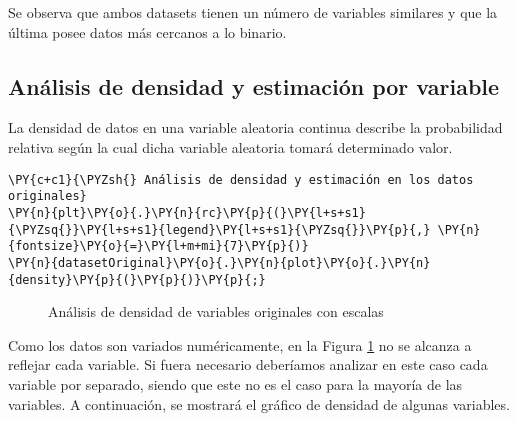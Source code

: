     Se observa que ambos datasets tienen un número de variables similares y que la última posee datos más cercanos a lo binario.

    \hypertarget{anuxe1lisis-de-densidad-y-estimaciuxf3n-por-variable}{%
\subsection{Análisis de densidad y estimación por variable}\label{anuxe1lisis-de-densidad-y-estimaciuxf3n-por-variable}}

La densidad de datos en una variable aleatoria continua describe la probabilidad relativa según la cual dicha variable aleatoria tomará determinado valor.

    \begin{tcolorbox}[breakable, size=fbox, boxrule=1pt, pad at break*=1mm,colback=cellbackground, colframe=cellborder]
\begin{Verbatim}[commandchars=\\\{\}]
\PY{c+c1}{\PYZsh{} Análisis de densidad y estimación en los datos originales}
\PY{n}{plt}\PY{o}{.}\PY{n}{rc}\PY{p}{(}\PY{l+s+s1}{\PYZsq{}}\PY{l+s+s1}{legend}\PY{l+s+s1}{\PYZsq{}}\PY{p}{,} \PY{n}{fontsize}\PY{o}{=}\PY{l+m+mi}{7}\PY{p}{)}
\PY{n}{datasetOriginal}\PY{o}{.}\PY{n}{plot}\PY{o}{.}\PY{n}{density}\PY{p}{(}\PY{p}{)}\PY{p}{;}
\end{Verbatim}
\end{tcolorbox}

\begin{center}
    	\begin{figure}[H]
	\centering
	\caption{Análisis de densidad de variables originales con escalas}
	\label{fig:advoe}
	\end{figure}
\end{center}
    
    Como los datos son variados numéricamente, en la Figura \ref{fig:advoe} no se alcanza a reflejar cada variable. Si fuera necesario deberíamos analizar en este caso cada variable por separado, siendo que este no es el caso para la mayoría de las variables. A continuación, se mostrará el gráfico de densidad de algunas variables.

